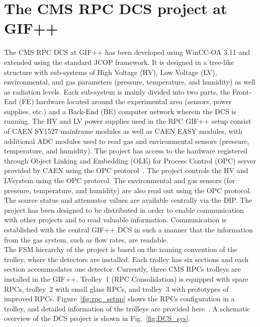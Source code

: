 \section{The CMS RPC DCS project at GIF++}\label{sec:rpc_proj}
The CMS RPC DCS at GIF++ has been developed using WinCC-OA 3.11 and extended using the standard JCOP framework. It is designed in a tree-like structure with sub-systems of High Voltage (HV), Low Voltage (LV), environmental, and gas parameters (pressure, temperature, and humidity) as well as radiation levels. Each sub-system is mainly divided into two parts, the Front-End (FE) hardware located around the experimental area (sensors, power supplies, etc.) and a Back-End (BE) computer network wherein the DCS is running. The HV and LV power supplies used in the RPC GIF++ setup consist of CAEN SY1527 mainframe modules as well as CAEN EASY modules, with additional ADC modules used to read gas and environmental sensors (pressure, temperature, and humidity). The project has access to the hardware registered through Object Linking and Embedding (OLE) for Process Control (OPC) server provided by CAEN using the OPC protocol~\cite{opc}. The project controls the HV and LVsystem using the OPC protocol. The environmental and gas sensors (for pressure, temperature, and humidity) are also read out using the OPC protocol. The source status and attenuator values are available centrally via the DIP. The project has been designed to be distributed in order to enable communication with other projects and to read valuable information. Communication is established with the central GIF++ DCS in such a manner that the information from the gas system, such as flow rates, are readable.\\
The FSM hierarchy of the project is based on the naming convention of the trolley, where the detectors are installed. Each trolley has six sections and each section accommodates one detector. Currently, three CMS RPCs trolleys are installed in the GIF++. Trolley~1 (RPC Consolidation) is equipped with spare RPCs, trolley~2 with small glass RPCs, and trolley~3 with prototypes of improved RPCs. Figure~\ref{fig:rpc_setup} shows the RPCs configuration in a trolley, and detailed information of the trolleys are provided here~\cite{salvador}. 
A schematic overview of the DCS project is shown in Fig.~\ref{fig:DCS_sys}.
